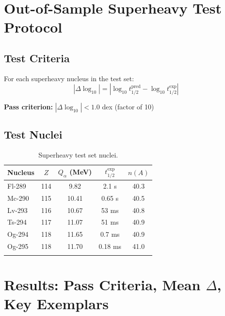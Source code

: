 \documentclass[11pt,a4paper]{article}
\begin{document}
\section{Out-of-Sample Superheavy Test Protocol}
\label{sec:oos_protocol}

\subsection{Test Criteria}

For each superheavy nucleus in the test set:
\begin{equation}
    |\Delta \log_{10}| = |\log_{10} t_{1/2}^{\text{pred}} - \log_{10} t_{1/2}^{\text{exp}}|
\end{equation}

\textbf{Pass criterion:} $|\Delta \log_{10}| < 1.0$ dex (factor of 10)

\subsection{Test Nuclei}

\begin{longtable}{lcccc}
\toprule
\textbf{Nucleus} & \textbf{$Z$} & \textbf{$Q_\alpha$ (MeV)} & \textbf{$t_{1/2}^{\text{exp}}$} & \textbf{$n(A)$} \\
\midrule
\endhead
Fl-289 & 114 & 9.82 & 2.1 s & 40.3 \\
Mc-290 & 115 & 10.41 & 0.65 s & 40.5 \\
Lv-293 & 116 & 10.67 & 53 ms & 40.8 \\
Ts-294 & 117 & 11.07 & 51 ms & 40.9 \\
Og-294 & 118 & 11.65 & 0.7 ms & 40.9 \\
Og-295 & 118 & 11.70 & 0.18 ms & 41.0 \\
\bottomrule
\caption{Superheavy test set nuclei.}
\end{longtable}

\section{Results: Pass Criteria, Mean $\Delta$, Key Exemplars}
\label{sec:oos_results}
\end{document}
